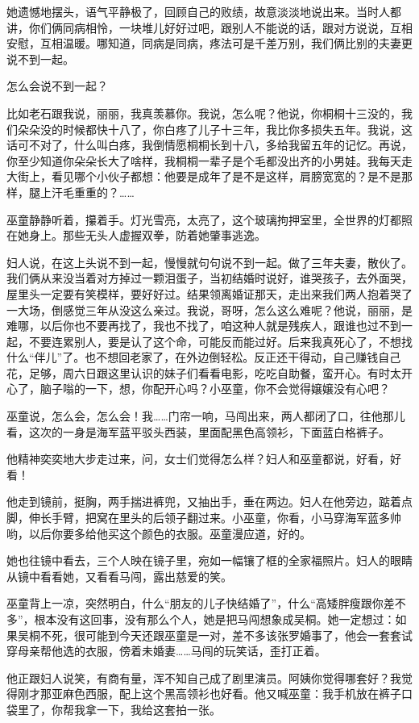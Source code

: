 \documentclass[lang=cn,newtx,12pt,scheme=chinese]{elegantbook}
\begin{document}
她遗憾地摆头，语气平静极了，回顾自己的败绩，故意淡淡地说出来。当时人都讲，你们俩同病相怜，一块堆儿好好过吧，跟别人不能说的话，跟对方说说，互相安慰，互相温暖。哪知道，同病是同病，疼法可是千差万别，我们俩比别的夫妻更说不到一起。

怎么会说不到一起？

比如老石跟我说，丽丽，我真羡慕你。我说，怎么呢？他说，你桐桐十三没的，我们朵朵没的时候都快十八了，你白疼了儿子十三年，我比你多损失五年。我说，这话可不对了，什么叫白疼，我倒情愿桐桐长到十八，多给我留五年的记忆。再说，你至少知道你朵朵长大了啥样，我桐桐一辈子是个毛都没出齐的小男娃。我每天走大街上，看见哪个小伙子都想：他要是成年了是不是这样，肩膀宽宽的？是不是那样，腿上汗毛重重的？……

巫童静静听着，攥着手。灯光雪亮，太亮了，这个玻璃拘押室里，全世界的灯都照在她身上。那些无头人虚握双拳，防着她肇事逃逸。

妇人说，在这上头说不到一起，慢慢就句句说不到一起。做了三年夫妻，散伙了。我们俩从来没当着对方掉过一颗泪蛋子，当初结婚时说好，谁哭孩子，去外面哭，屋里头一定要有笑模样，要好好过。结果领离婚证那天，走出来我们两人抱着哭了一大场，倒感觉三年从没这么亲过。我说，哥呀，怎么这么难呢？他说，丽丽，是难哪，以后你也不要再找了，我也不找了，咱这种人就是残疾人，跟谁也过不到一起，不要连累别人，要是认了这个命，可能反而能过好。后来我真死心了，不想找什么“伴儿”了。也不想回老家了，在外边倒轻松。反正还干得动，自己赚钱自己花，足够，周六日跟这里认识的妹子们看看电影，吃吃自助餐，蛮开心。有时太开心了，脑子嗡的一下，想，你配开心吗？小巫童，你不会觉得嬢嬢没有心吧？

巫童说，怎么会，怎么会！我……门帘一响，马闯出来，两人都闭了口，往他那儿看，这次的一身是海军蓝平驳头西装，里面配黑色高领衫，下面蓝白格裤子。

他精神奕奕地大步走过来，问，女士们觉得怎么样？妇人和巫童都说，好看，好看！

他走到镜前，挺胸，两手揣进裤兜，又抽出手，垂在两边。妇人在他旁边，踮着点脚，伸长手臂，把窝在里头的后领子翻过来。小巫童，你看，小马穿海军蓝多帅哟，以后你要多给他买这个颜色的衣服。巫童漫应道，好的。

她也往镜中看去，三个人映在镜子里，宛如一幅镶了框的全家福照片。妇人的眼睛从镜中看看她，又看看马闯，露出慈爱的笑。

巫童背上一凉，突然明白，什么“朋友的儿子快结婚了”，什么“高矮胖瘦跟你差不多”，根本没有这回事，没有那么个人，她是把马闯想象成吴桐。她一定想过：如果吴桐不死，很可能到今天还跟巫童是一对，差不多该张罗婚事了，他会一套套试穿母亲帮他选的衣服，傍着未婚妻……马闯的玩笑话，歪打正着。

他正跟妇人说笑，有商有量，浑不知自己成了剧里演员。阿姨你觉得哪套好？我觉得刚才那亚麻色西服，配上这个黑高领衫也好看。他又喊巫童：我手机放在裤子口袋里了，你帮我拿一下，我给这套拍一张。
\end{document}
